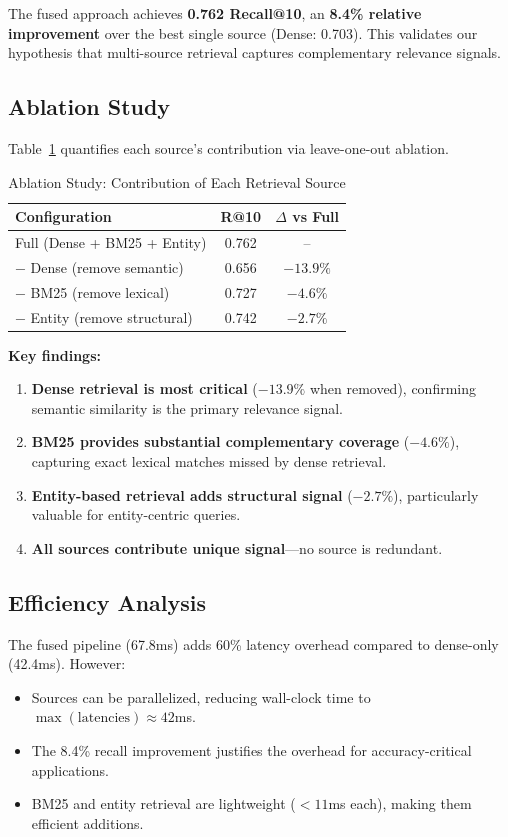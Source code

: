 \documentclass[11pt,a4paper]{article}
\begin{document}
The fused approach achieves \textbf{0.762 Recall@10}, an \textbf{8.4\% relative improvement} over the best single source (Dense: 0.703). This validates our hypothesis that multi-source retrieval captures complementary relevance signals.

\subsection{Ablation Study}

Table~\ref{tab:ablation} quantifies each source's contribution via leave-one-out ablation.

\begin{table}[h]
\centering
\caption{Ablation Study: Contribution of Each Retrieval Source}
\label{tab:ablation}
\begin{tabular}{lcc}
\toprule
\textbf{Configuration} & \textbf{R@10} & \textbf{$\Delta$ vs Full} \\
\midrule
Full (Dense + BM25 + Entity) & 0.762 & -- \\
\midrule
$-$ Dense (remove semantic) & 0.656 & $-13.9\%$ \\
$-$ BM25 (remove lexical) & 0.727 & $-4.6\%$ \\
$-$ Entity (remove structural) & 0.742 & $-2.7\%$ \\
\bottomrule
\end{tabular}
\end{table}

\textbf{Key findings:}
\begin{enumerate}
    \item \textbf{Dense retrieval is most critical} ($-13.9\%$ when removed), confirming semantic similarity is the primary relevance signal.
    \item \textbf{BM25 provides substantial complementary coverage} ($-4.6\%$), capturing exact lexical matches missed by dense retrieval.
    \item \textbf{Entity-based retrieval adds structural signal} ($-2.7\%$), particularly valuable for entity-centric queries.
    \item \textbf{All sources contribute unique signal}---no source is redundant.
\end{enumerate}

\subsection{Efficiency Analysis}

The fused pipeline (67.8ms) adds 60\% latency overhead compared to dense-only (42.4ms). However:
\begin{itemize}
    \item Sources can be parallelized, reducing wall-clock time to $\max(\text{latencies}) \approx 42$ms.
    \item The 8.4\% recall improvement justifies the overhead for accuracy-critical applications.
    \item BM25 and entity retrieval are lightweight ($<11$ms each), making them efficient additions.
\end{itemize}
\end{document}

